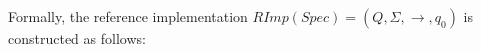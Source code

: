 %
%
%
%
%
%
%

Formally, the reference implementation $\mathit{RImp}(\mathit{Spec}) = (Q,\Sigma,\rightarrow,q_0)$ is constructed as follows:



